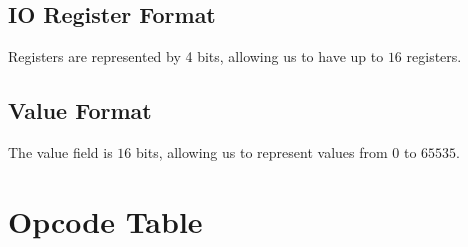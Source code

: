 \documentclass[12pt,a4paper]{article}
\begin{document}
\subsection{IO Register Format}

Registers are represented by 4 bits, allowing us to have up to $16$ registers.

\subsection{Value Format}

The value field is $16$ bits, allowing us to represent values from $0$ to
$65535$.

\section{Opcode Table}
\end{document}
